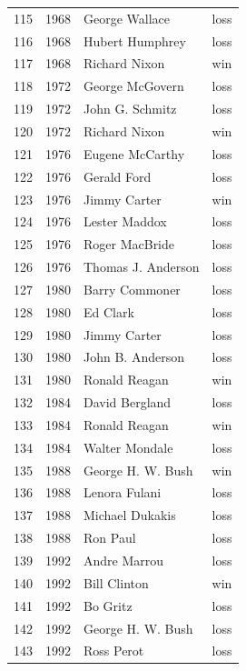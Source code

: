\documentclass[
  letterpaper,
  DIV=11,
  numbers=noendperiod]{scrreprt}
\begin{document}
\begin{tabular}{lrll}
115 &  1968 &          George Wallace &   loss \\
116 &  1968 &         Hubert Humphrey &   loss \\
117 &  1968 &           Richard Nixon &    win \\
118 &  1972 &         George McGovern &   loss \\
119 &  1972 &         John G. Schmitz &   loss \\
120 &  1972 &           Richard Nixon &    win \\
121 &  1976 &         Eugene McCarthy &   loss \\
122 &  1976 &             Gerald Ford &   loss \\
123 &  1976 &            Jimmy Carter &    win \\
124 &  1976 &           Lester Maddox &   loss \\
125 &  1976 &          Roger MacBride &   loss \\
126 &  1976 &      Thomas J. Anderson &   loss \\
127 &  1980 &          Barry Commoner &   loss \\
128 &  1980 &                Ed Clark &   loss \\
129 &  1980 &            Jimmy Carter &   loss \\
130 &  1980 &        John B. Anderson &   loss \\
131 &  1980 &           Ronald Reagan &    win \\
132 &  1984 &          David Bergland &   loss \\
133 &  1984 &           Ronald Reagan &    win \\
134 &  1984 &          Walter Mondale &   loss \\
135 &  1988 &       George H. W. Bush &    win \\
136 &  1988 &           Lenora Fulani &   loss \\
137 &  1988 &         Michael Dukakis &   loss \\
138 &  1988 &                Ron Paul &   loss \\
139 &  1992 &            Andre Marrou &   loss \\
140 &  1992 &            Bill Clinton &    win \\
141 &  1992 &                Bo Gritz &   loss \\
142 &  1992 &       George H. W. Bush &   loss \\
143 &  1992 &              Ross Perot &   loss \\

\end{tabular}
\end{document}
